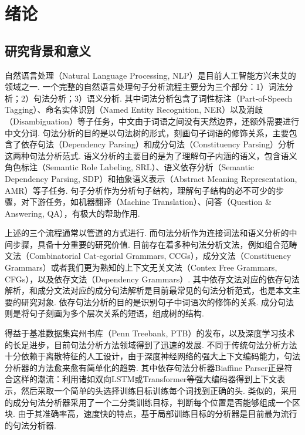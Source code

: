\chapter{绪论}
\label{cha:intro}

\section{研究背景和意义}

自然语言处理（Natural Language Processing, NLP）是目前人工智能方兴未艾的领域之一.
一个完整的自然语言处理句子分析流程主要分为三个部分：1）词法分析；2）句法分析；3）语义分析.
其中词法分析包含了词性标注（Part-of-Speech Tagging）、命名实体识别（Named Entity Recognition, NER）以及消歧（Disambiguation）等子任务，中文由于词语之间没有天然边界，还额外需要进行中文分词.
句法分析的目的是以句法树的形式，刻画句子词语的修饰关系，主要包含了依存句法（Dependency Parsing）和成分句法（Constituency Parsing）分析这两种句法分析范式.
语义分析的主要目的是为了理解句子内涵的语义，包含语义角色标注（Semantic Role Labeling, SRL）、语义依存分析（Semantic Dependency Parsing, SDP）和抽象语义表示（Abstract Meaning Representation, AMR）等子任务.
句子分析作为分析句子结构，理解句子结构的必不可少的步骤，对下游任务，如机器翻译（Machine Translation）、问答（Question \& Answering, QA），有极大的帮助作用.

上述的三个流程通常以管道的方式进行.
而句法分析作为连接词法和语义分析的中间步骤，具备十分重要的研究价值.
目前存在着多种句法分析文法，例如组合范畴文法（Combinatorial Cat-egorial Grammars, CCGs），成分文法（Constituency Grammars）或者我们更为熟知的上下文无关文法（Contex Free Grammars, CFGs），以及依存文法（Dependency Grammars）.
其中依存文法对应的依存句法解析，和成分文法对应的成分句法解析是目前最常见的句法分析范式，也是本文主要的研究对象.
依存句法分析的目的是识别句子中词语次的修饰的关系.
成分句法则是将句子刻画为多个层次关系的短语，组成树的结构.

得益于基准数据集宾州书库（Penn Treebank, PTB）的发布，以及深度学习技术的长足进步，目前句法分析方法领域得到了迅速的发展.
不同于传统句法分析方法十分依赖于离散特征的人工设计，由于深度神经网络的强大上下文编码能力，句法分析器的方法愈来愈有简单化的趋势.
其中依存句法分析器Biaffine Parser\citep{dozat-etal-2017-biaffine}正是符合这样的潮流：利用诸如双向LSTM或Transformer\citep{vaswani-2017-attention}等强大编码器得到上下文表示，然后采取一个简单的头选择训练目标训练每个词找到正确的头.
类似的，\citet{gaddy-etal-2018-whats}采用的成分句法分析器采用了一个二分类训练目标，判断每个位置是否能够组成一个区块.
由于其准确率高，速度快的特点，基于局部训练目标的分析器是目前最为流行的句法分析器.

